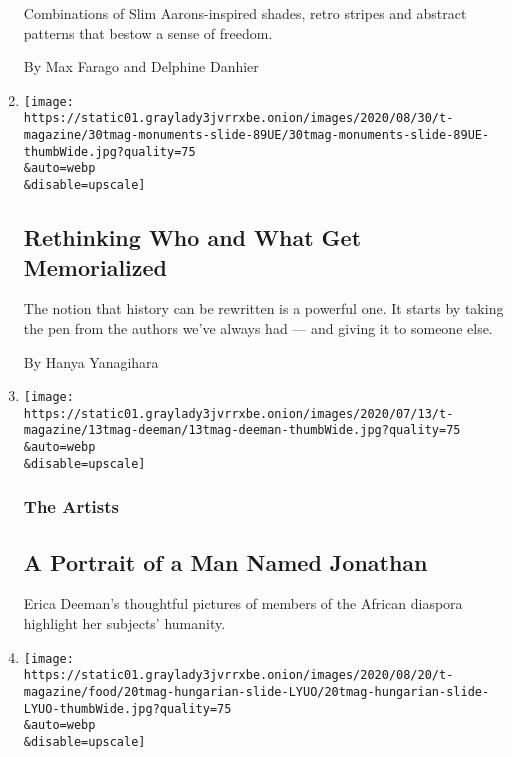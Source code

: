 \begin{enumerate}
  Combinations of Slim Aarons-inspired shades, retro stripes and
  abstract patterns that bestow a sense of freedom.

  By Max Farago and Delphine Danhier
\item
  \href{/2020/08/24/t-magazine/monuments-womens-fashion-issue.html}{}

  \texttt{[image: https://static01.graylady3jvrrxbe.onion/images/2020/08/30/t-magazine/30tmag-monuments-slide-89UE/30tmag-monuments-slide-89UE-thumbWide.jpg?quality=75\\\&auto=webp\\\&disable=upscale]}

  \hypertarget{rethinking-who-and-what-get-memorialized}{%
  \subsection{Rethinking Who and What Get
  Memorialized}\label{rethinking-who-and-what-get-memorialized}}

  The notion that history can be rewritten is a powerful one. It starts
  by taking the pen from the authors we've always had --- and giving it
  to someone else.

  By Hanya Yanagihara
\item
  \href{/2020/08/21/t-magazine/erica-deeman-artist-portrait.html}{}

  \texttt{[image: https://static01.graylady3jvrrxbe.onion/images/2020/07/13/t-magazine/13tmag-deeman/13tmag-deeman-thumbWide.jpg?quality=75\\\&auto=webp\\\&disable=upscale]}

  \hypertarget{the-artists-1}{%
  \subsubsection{The Artists}\label{the-artists-1}}

  \hypertarget{a-portrait-of-a-man-named-jonathan}{%
  \subsection{A Portrait of a Man Named
  Jonathan}\label{a-portrait-of-a-man-named-jonathan}}

  Erica Deeman's thoughtful pictures of members of the African diaspora
  highlight her subjects' humanity.
\item
  \href{/2020/08/21/t-magazine/hungarian-pastry-shop-new-york.html}{}

  \texttt{[image: https://static01.graylady3jvrrxbe.onion/images/2020/08/20/t-magazine/food/20tmag-hungarian-slide-LYUO/20tmag-hungarian-slide-LYUO-thumbWide.jpg?quality=75\\\&auto=webp\\\&disable=upscale]}


\end{enumerate}

